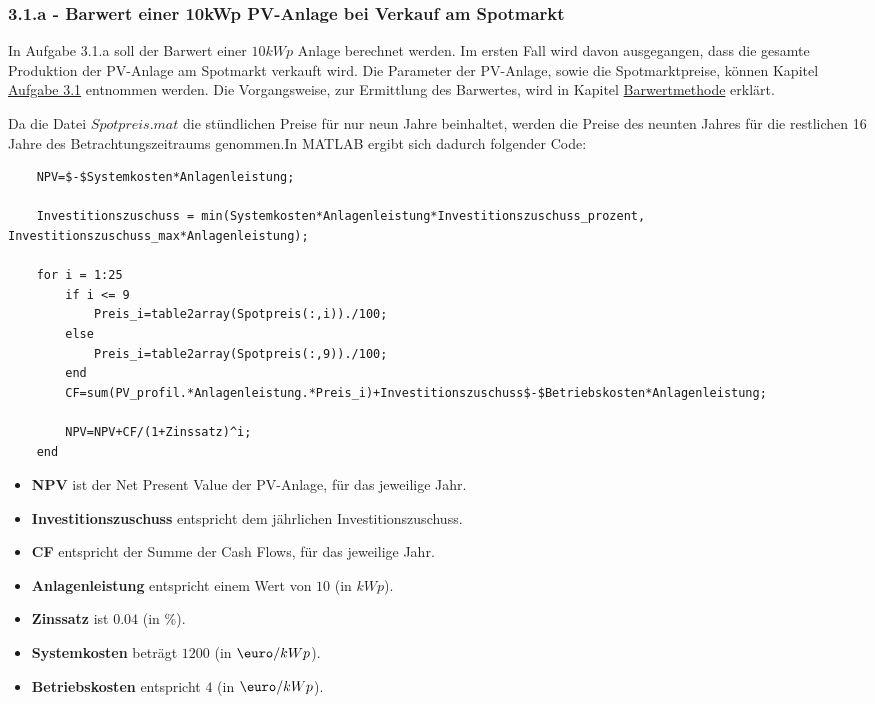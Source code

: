 \documentclass[a4paper,12pt]{article}
\begin{document}
	\subsubsection{3.1.a - Barwert einer 10kWp PV-Anlage bei Verkauf am Spotmarkt}
	In Aufgabe 3.1.a soll der Barwert einer $10kWp$ Anlage berechnet werden. Im ersten Fall wird davon ausgegangen, dass die gesamte Produktion der PV-Anlage am Spotmarkt verkauft wird. Die Parameter der PV-Anlage, sowie die Spotmarktpreise, können Kapitel \hyperref[sec:Aufgabenstellung31]{Aufgabe 3.1} entnommen werden.\newline
	Die Vorgangsweise, zur Ermittlung des Barwertes, wird in Kapitel \hyperref[sec:BerechnungenBarwertmethode]{Barwertmethode} erklärt.\\ \par
	\noindent Da die Datei $Spotpreis.mat$ die stündlichen Preise für nur neun Jahre beinhaltet, werden die Preise des neunten Jahres für die restlichen 16 Jahre des Betrachtungszeitraums genommen.\newline In MATLAB ergibt sich dadurch folgender Code:
	\begin{lstlisting}
	NPV=$-$Systemkosten*Anlagenleistung;

	Investitionszuschuss = min(Systemkosten*Anlagenleistung*Investitionszuschuss_prozent, Investitionszuschuss_max*Anlagenleistung);
	
	for i = 1:25
		if i <= 9
			Preis_i=table2array(Spotpreis(:,i))./100;
		else
			Preis_i=table2array(Spotpreis(:,9))./100;
		end
		CF=sum(PV_profil.*Anlagenleistung.*Preis_i)+Investitionszuschuss$-$Betriebskosten*Anlagenleistung;
	
		NPV=NPV+CF/(1+Zinssatz)^i;
	end
	\end{lstlisting}
	\begin{itemize}
		\item \textbf{NPV} ist der Net Present Value der PV-Anlage, für das jeweilige Jahr.
		\item \textbf{Investitionszuschuss} entspricht dem jährlichen Investitionszuschuss.
		\item \textbf{CF} entspricht der Summe der Cash Flows, für das jeweilige Jahr.
		\item \textbf{Anlagenleistung} entspricht einem Wert von $10$ (in $kWp$).
		\item \textbf{Zinssatz} ist $0.04$ (in \%).
		\item \textbf{Systemkosten} beträgt $1200$ (in $\mbox{\euro}/kWp$).
		\item \textbf{Betriebskosten} entspricht $4$ (in $\mbox{\euro}/kWp$).
	\end{itemize}
\end{document}
